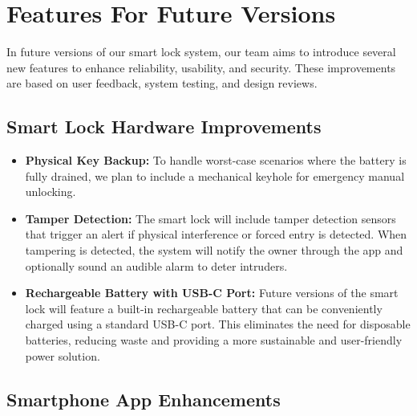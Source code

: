 \newpage %

\section{Features For Future Versions}

In future versions of our smart lock system, our team aims to introduce several new features to enhance reliability, usability, and security. These improvements are based on user feedback, system testing, and design reviews.

\begin{comment}
    - Lock has a hole for a physical key to unlock door for emergency emergency case!
    - Make bluetooth an option to open the door, without clicking the lock and unlock button.
    - Sending notifications about battery health when door lock is low battery
    - Send notifications about the lock having no network
    - Implementing a more secure algorithm for the input pin
\end{comment}

\subsection{Smart Lock Hardware Improvements}

\begin{itemize}
    \item \textbf{Physical Key Backup:}  
    To handle worst-case scenarios where the battery is fully drained, we plan to include a mechanical keyhole for emergency manual unlocking.

    \item \textbf{Tamper Detection:}  
    The smart lock will include tamper detection sensors that trigger an alert if physical interference or forced entry is detected. When tampering is detected, the system will notify the owner through the app and optionally sound an audible alarm to deter intruders.

    \item \textbf{Rechargeable Battery with USB-C Port:}  
    Future versions of the smart lock will feature a built-in rechargeable battery that can be conveniently charged using a standard USB-C port. This eliminates the need for disposable batteries, reducing waste and providing a more sustainable and user-friendly power solution.
\end{itemize}


\subsection{Smartphone App Enhancements}

